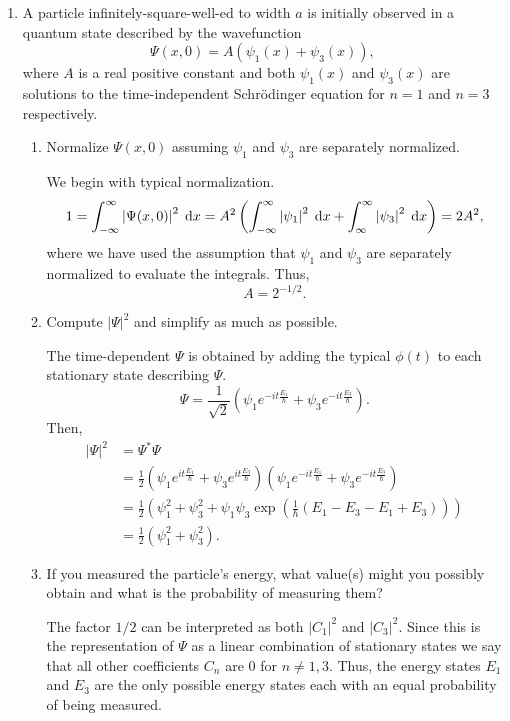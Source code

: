 \documentclass[a4paper, 12pt]{config/homework}
\begin{document}
\begin{enumerate}
\begin{enumerate}[label=(\alph*)]
\end{enumerate}

\pagebreak
\item A particle infinitely-square-well-ed to width \(a\) is initially observed in a quantum state described by the wavefunction
\[\Psi(x,0) = A \left(\psi_1(x) + \psi_3(x)\right),\]
where \(A\) is a real positive constant and both \(\psi_1(x)\) and \(\psi_3(x)\) are solutions to the time-independent Schr{\"o}dinger equation for \(n=1\) and \(n=3\) respectively.
\begin{enumerate}[label=(\alph*)]
\item Normalize \(\Psi(x,0)\) assuming \(\psi_1\) and \(\psi_3\) are separately normalized.

We begin with typical normalization.
\[1 = \bint{-\infty}{\infty}{\left|\Psi(x,0)\right|^2}{x} = A^2\left( \bint{-\infty}{\infty}{\left|\psi_1\right|^2}{x} + \bint{\infty}{\infty}{\left|\psi_3\right|^2}{x}\right) = 2A^2,\]
where we have used the assumption that \(\psi_1\) and \(\psi_3\) are separately normalized to evaluate the integrals. Thus,
\[A = 2^{-1/2}.\]

\item Compute \(\left|\Psi\right|^2\) and simplify as much as possible.

The time-dependent \(\Psi\) is obtained by adding the typical \(\phi(t)\) to each stationary state describing \(\Psi\).
\[\Psi = \frac{1}{\sqrt{2}} \left(\psi_1 e^{-it \frac{E_1}{\hbar}} + \psi_3e^{-it \frac{E_3}{\hbar}}\right).\]
Then,
\begin{align*}
\left|\Psi\right|^2 &= \Psi^* \Psi
\\&= \frac{1}{2} \left(\psi_1 e^{it \frac{E_1}{\hbar}} + \psi_3e^{it \frac{E_3}{\hbar}}\right) \left(\psi_1 e^{-it \frac{E_1}{\hbar}} + \psi_3e^{-it \frac{E_3}{\hbar}}\right)
\\&= \frac{1}{2} \left( \psi_1^2 + \psi_3^2 + \psi_1\psi_3\exp\left(\frac{1}{\hbar}\left( E_1 - E_3 -E_1 + E_3 \right) \right) \right)
\\&= \frac{1}{2} \left( \psi_1^2 + \psi_3^2 \right).
\end{align*}

\item If you measured the particle's energy, what value(s) might you possibly obtain and what is the probability of measuring them?

The factor \(1/2\) can be interpreted as both \(\left|C_1\right|^2\) and \(\left|C_3\right|^2\). Since this is the representation of \(\Psi\) as a linear combination of stationary states we say that all other coefficients \(C_n\) are 0 for \(n\ne1,3\). Thus, the energy states \(E_1\) and \(E_3\) are the only possible energy states each with an equal probability of being measured.

\end{enumerate}
\end{enumerate}
\end{document}
